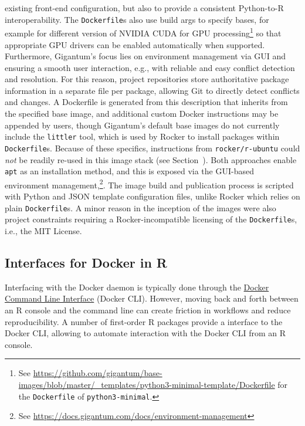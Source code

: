 existing front-end configuration, but also to provide a consistent
Python-to-R interoperability. The \texttt{Dockerfile}s also use build
args to specify bases, for example for different version of NVIDIA CUDA
for GPU
processing\footnote{See \href{https://github.com/gigantum/base-images/blob/master/_templates/python3-minimal-template/Dockerfile}{https://github.com/gigantum/base-images/blob/master/\_templates/python3-minimal-template/Dockerfile} for the \texttt{Dockerfile} of \texttt{python3-minimal}.}
so that appropriate GPU drivers can be enabled automatically when
supported. Furthermore, Gigantum's focus lies on environment management
via GUI and ensuring a smooth user interaction, e.g., with reliable and
easy conflict detection and resolution. For this reason, project
repositories store authoritative package information in a separate file
per package, allowing Git to directly detect conflicts and changes. A
Dockerfile is generated from this description that inherits from the
specified base image, and additional custom Docker instructions may be
appended by users, though Gigantum's default base images do not
currently include the \texttt{littler} tool, which is used by Rocker to
install packages within \texttt{Dockerfile}s. Because of these
specifics, instructions from \texttt{rocker/r-ubuntu} could \emph{not}
be readily re-used in this image stack (see
Section~). Both approaches enable \texttt{apt} as
an installation method, and this is exposed via the GUI-based
environment
management,\footnote{See \href{https://docs.gigantum.com/docs/environment-management}{https://docs.gigantum.com/docs/environment-management}}.
The image build and publication process is scripted with Python and JSON
template configuration files, unlike Rocker which relies on plain
\texttt{Dockerfile}s. A minor reason in the inception of the images were
also project constraints requiring a Rocker-incompatible licensing of
the \texttt{Dockerfile}s, i.e., the MIT License.

\hypertarget{interfaces-for-docker-in-r}{%
\subsection{Interfaces for Docker in
R}\label{interfaces-for-docker-in-r}}

\label{interfaces}

Interfacing with the Docker daemon is typically done through the
\href{https://docs.docker.com/engine/reference/commandline/cli/}{Docker
Command Line Interface} (Docker CLI). However, moving back and forth
between an R console and the command line can create friction in
workflows and reduce reproducibility. A number of first-order R packages
provide a interface to the Docker CLI, allowing to automate interaction
with the Docker CLI from an R console.

